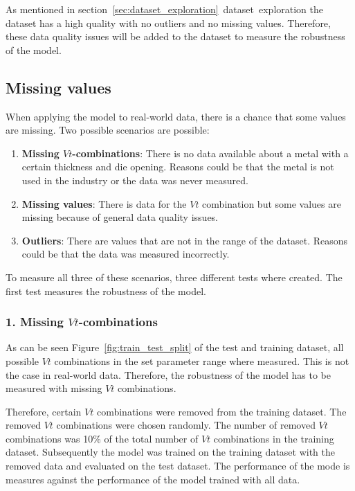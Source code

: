 As mentioned in section~\ref{sec:dataset_exploration}~dataset~exploration the dataset has a high quality with no outliers and no missing values.
Therefore, these data quality issues will be added to the dataset to measure the robustness of the model.

\subsection{Missing values}
When applying the model to real-world data, there is a chance that some values are missing. Two possible scenarios are possible:

\begin{enumerate}
    \item \textbf{Missing $Vt$-combinations}: There is no data available about a metal with a certain thickness and die opening. Reasons could be that the metal is not used in the industry or the data was never measured.
    \item \textbf{Missing values}: There is data for the $Vt$ combination but some values are missing because of general data quality issues.
    \item \textbf{Outliers}: There are values that are not in the range of the dataset. Reasons could be that the data was measured incorrectly.
\end{enumerate}

To measure all three of these scenarios, three different tests where created. The first test measures the robustness of the model.

\subsubsection*{1. Missing $Vt$-combinations}
As can be seen Figure~\ref{fig:train_test_split} of the test and training dataset, all possible $Vt$ combinations in the set parameter range where measured.
This is not the case in real-world data. Therefore, the robustness of the model has to be measured with missing $Vt$ combinations.

Therefore, certain $Vt$ combinations were removed from the training dataset. The removed $Vt$ combinations were chosen randomly. The number of removed $Vt$ combinations was 10\% of the total number of $Vt$ combinations in the training dataset.
Subsequently the model was trained on the training dataset with the removed data and evaluated on the test dataset.
The performance of the mode is measures against the performance of the model trained with all data. 

